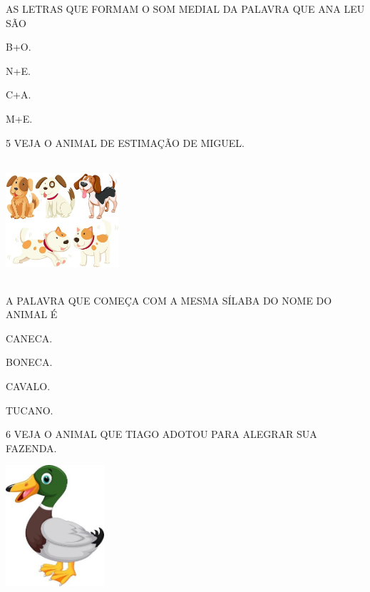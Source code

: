 AS LETRAS QUE FORMAM O SOM MEDIAL DA PALAVRA QUE ANA LEU SÃO

\begin{escolha}
\item B+O.

\item N+E.

\item C+A.

\item M+E.
\end{escolha}

\num{5} VEJA O ANIMAL DE ESTIMAÇÃO DE MIGUEL.

\includegraphics[width=1.65208in,height=1.75972in]{media/image214.jpg}


A PALAVRA QUE COMEÇA COM A MESMA SÍLABA DO NOME DO ANIMAL É 

\begin{escolha}
\item CANECA.

\item BONECA.

\item CAVALO.

\item TUCANO.
\end{escolha}

\num{6} VEJA O ANIMAL QUE TIAGO ADOTOU PARA ALEGRAR SUA FAZENDA.

\includegraphics[width=1.43478in,height=1.76408in]{media/image215.jpg}


